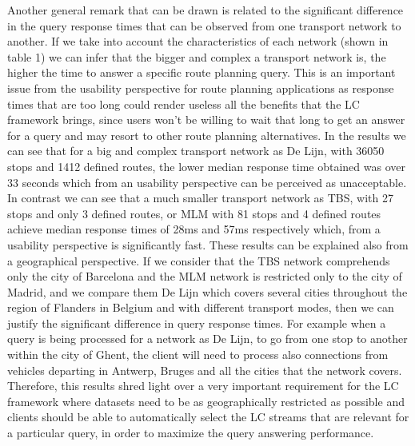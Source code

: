 \documentclass[sw]{iosart2x}
\begin{document}
	Another general remark that can be drawn is related to the significant difference in the query response times that can be observed from one transport network to another. If we take into account the characteristics of each network (shown in table 1) we can infer that the bigger and complex a transport network is, the higher the time to answer a specific route planning query. This is an important issue from the usability perspective for route planning applications as response times that are too long could render useless all the benefits that the LC framework brings, since users won't be willing to wait that long to get an answer for a query and may resort to other route planning alternatives. In the results we can see that for a big and complex transport network as De Lijn, with 36050 stops and 1412 defined routes, the lower median response time obtained was over 33 seconds which from an usability perspective can be perceived as unacceptable. In contrast we can see that a much smaller transport network as TBS, with 27 stops and only 3 defined routes, or MLM with 81 stops and 4 defined routes achieve median response times of 28ms and 57ms respectively which, from a usability perspective is significantly fast. These results can be explained also from a geographical perspective. If we consider that the TBS network comprehends only the city of Barcelona and the MLM network is restricted only to the city of Madrid, and we compare them De Lijn which covers several cities throughout the region of Flanders in Belgium and with different transport modes, then we can justify the significant difference in query response times. For example when a query is being processed for a network as De Lijn, to go from one stop to another within the city of Ghent, the client will need to process also connections from vehicles departing in Antwerp, Bruges and all the cities that the network covers. Therefore, this results shred light over a very important requirement for the LC framework where datasets need to be as geographically restricted as possible and clients should be able to automatically select the LC streams that are relevant for a particular query, in order to maximize the query answering performance.
	
\end{document}
